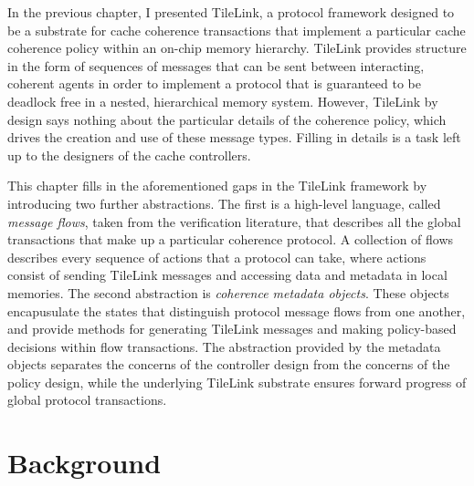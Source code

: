 In the previous chapter, I presented TileLink,
a protocol framework designed to be a substrate for cache coherence transactions that implement a particular cache coherence policy within an on-chip memory hierarchy. 
TileLink provides structure in the form of sequences of messages that can be sent between interacting, coherent agents in order
to implement a protocol that is guaranteed to be deadlock free in a nested, hierarchical memory system.
However, TileLink by design says nothing about the particular details of the coherence policy,
which drives the creation and use of these message types.
Filling in details is a task left up to the designers of the cache controllers.

This chapter fills in the aforementioned gaps in the TileLink framework by introducing two further abstractions.
The first is a high-level language,
called \emph{message flows},
taken from the verification literature, 
that describes all the global transactions that make up a particular coherence protocol.
A collection of flows describes every sequence of actions that a protocol can take,
where actions consist of sending TileLink messages and accessing  data and metadata in local memories.
The second abstraction is \emph{coherence metadata objects}.
These objects encapusulate the states that distinguish protocol message flows from one another,
and provide methods for generating TileLink messages and making policy-based decisions within flow transactions.
The abstraction provided by the metadata objects separates the concerns of the controller design from the concerns of the policy design, 
while the underlying TileLink substrate ensures forward progress of global protocol transactions.

\section{Background} 

